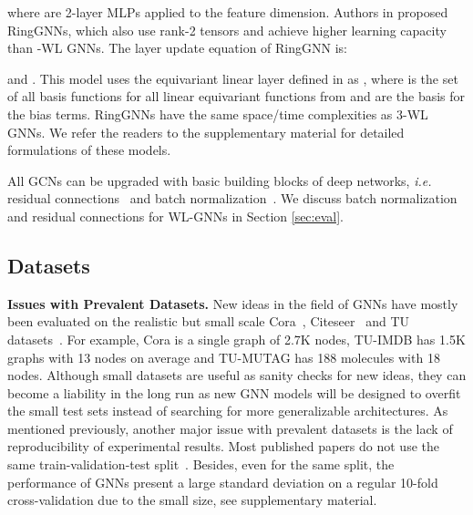 \documentclass{article}
\begin{document}
where  are 2-layer MLPs applied to the feature dimension. Authors in \cite{chen2019equivalence} proposed RingGNNs, which also use rank-2 tensors and achieve higher learning capacity than -WL GNNs.
The layer update equation  
of RingGNN is:

and . This model uses the equivariant linear layer  defined in \cite{maron2018invariant} as , where  is the set of all basis functions for all linear equivariant functions from  and  are the basis for the bias terms. 
RingGNNs have the same space/time complexities as 3-WL GNNs. 
We refer the readers to the supplementary material for detailed formulations of these models.

All GCNs can be upgraded with basic building blocks of deep networks, \textit{i.e.} residual connections~\cite{He_2016_CVPR,li2019deepgcns} and batch normalization~\cite{ioffe2015batch}.
We discuss batch normalization and residual connections for WL-GNNs in Section \ref{sec:eval}.













\subsection{Datasets}
\label{sec:datasets}


{\bf Issues with Prevalent Datasets. } 
New ideas in the field of GNNs have mostly been evaluated on the realistic but small scale Cora~\cite{mccallum2000automating}, Citeseer~\cite{getoor2005link} and TU datasets~\cite{KKMMN2016tudata}.
For example, Cora is a single graph of 2.7K nodes, TU-IMDB has 1.5K graphs with 13 nodes on average and TU-MUTAG has 188 molecules with 18 nodes.
Although small datasets are useful as sanity checks for new ideas, they can become a liability in the long run as new GNN models will be designed to overfit the small test sets instead of searching for more generalizable architectures. 
As mentioned previously, another major issue with prevalent datasets is the lack of reproducibility of experimental results. 
Most published papers do not use the same train-validation-test split~\cite{errica2019fair}. 
Besides, even for the same split, the performance of GNNs present a large standard deviation on a regular 10-fold cross-validation due to the small size, see supplementary material.
\end{document}
